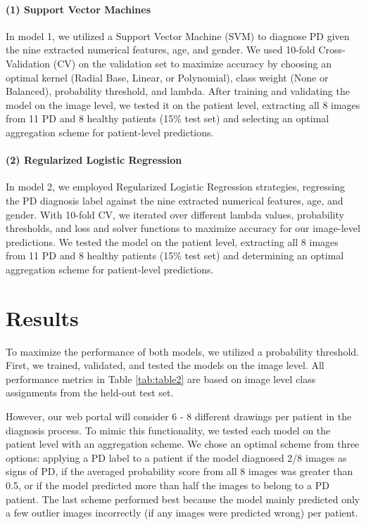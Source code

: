 \documentclass[pmlr,twocolumn,10pt,breaklinks, x11names,table]{jmlr} %
\begin{document}
\label{sec:SVM}  
\paragraph{(1) Support Vector Machines} In model 1, we utilized a Support Vector Machine (SVM) \citep{708428} to diagnose PD given the nine extracted numerical features, age, and gender. We used 10-fold Cross-Validation (CV) \citep{stone1974cross} on the validation set to maximize accuracy by choosing an optimal kernel (Radial Base, Linear, or Polynomial), class weight (None or Balanced), probability threshold, and lambda. After training and validating the model on the image level, we tested it on the patient level, extracting all 8 images from 11 PD and 8 healthy patients (15\% test set) and selecting an optimal aggregation scheme for patient-level predictions.  

\label{sec:LogReg}  
\paragraph{(2) Regularized Logistic Regression} In model 2, we employed Regularized Logistic Regression \citep{tibshirani1996regression} strategies, regressing the PD diagnosis label against the nine extracted numerical features, age, and gender. With 10-fold CV, we iterated over different lambda values, probability thresholds, and loss and solver functions to maximize accuracy for our image-level predictions. We tested the model on the patient level, extracting all 8 images from 11 PD and 8 healthy patients (15\% test set) and determining an optimal aggregation scheme for patient-level predictions.  

\section{Results}
\label{Results} To maximize the performance of both models, we utilized a probability threshold. First, we trained, validated, and tested the models on the image level. All performance metrics in Table \ref{tab:table2} are based on image level class assignments from the held-out test set.

However, our web portal will consider 6 - 8 different drawings per patient in the diagnosis process. To mimic this functionality, we tested each model on the patient level with an aggregation scheme. We chose an optimal scheme from three options: applying a PD label to a patient if the model diagnosed 2/8 images as signs of PD, if the averaged probability score from all 8 images was greater than 0.5, or if the model predicted more than half the images to belong to a PD patient. The last scheme performed best because the model mainly predicted only a few outlier images incorrectly (if any images were predicted wrong) per patient.
\end{document}
